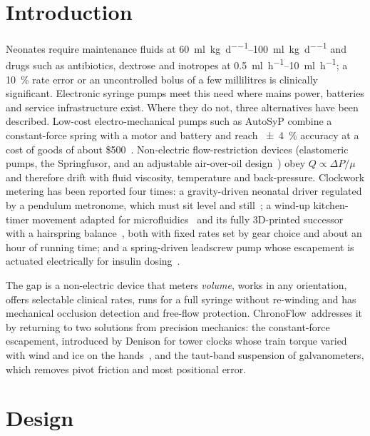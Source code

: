 \documentclass[11pt,a4paper]{article}
\newcommand{\ChronoFlow}{ChronoFlow}
\begin{document}
\section{Introduction}
Neonates require maintenance fluids at \SIrange{60}{100}{\milli\litre\per\kilo\gram\per\day} and drugs such as antibiotics, dextrose and inotropes at \SIrange{0.5}{10}{\milli\litre\per\hour}; a \SI{10}{\percent} rate error or an uncontrolled bolus of a few millilitres is clinically significant. Electronic syringe pumps meet this need where mains power, batteries and service infrastructure exist. Where they do not, three alternatives have been described. Low-cost electro-mechanical pumps such as AutoSyP combine a constant-force spring with a motor and battery and reach \SI{\pm 4}{\percent} accuracy at a cost of goods of about \$500~\cite{autosyp}. Non-electric flow-restriction devices (elastomeric pumps, the Springfusor, and an adjustable air-over-oil design~\cite{asme2017}) obey $Q \propto \Delta P/\mu$ and therefore drift with fluid viscosity, temperature and back-pressure. Clockwork metering has been reported four times: a gravity-driven neonatal driver regulated by a pendulum metronome, which must sit level and still~\cite{asme2011}; a wind-up kitchen-timer movement adapted for microfluidics~\cite{han2021} and its fully 3D-printed successor with a hairspring balance~\cite{park2024snb,park2024hx}, both with fixed rates set by gear choice and about an hour of running time; and a spring-driven leadscrew pump whose escapement is actuated electrically for insulin dosing~\cite{pooke2023}.

The gap is a non-electric device that meters \emph{volume}, works in any orientation, offers selectable clinical rates, runs for a full syringe without re-winding and has mechanical occlusion detection and free-flow protection. \ChronoFlow\ addresses it by returning to two solutions from precision mechanics: the constant-force escapement, introduced by Denison for tower clocks whose train torque varied with wind and ice on the hands~\cite{denison}, and the taut-band suspension of galvanometers, which removes pivot friction and most positional error.

\section{Design}
\end{document}
